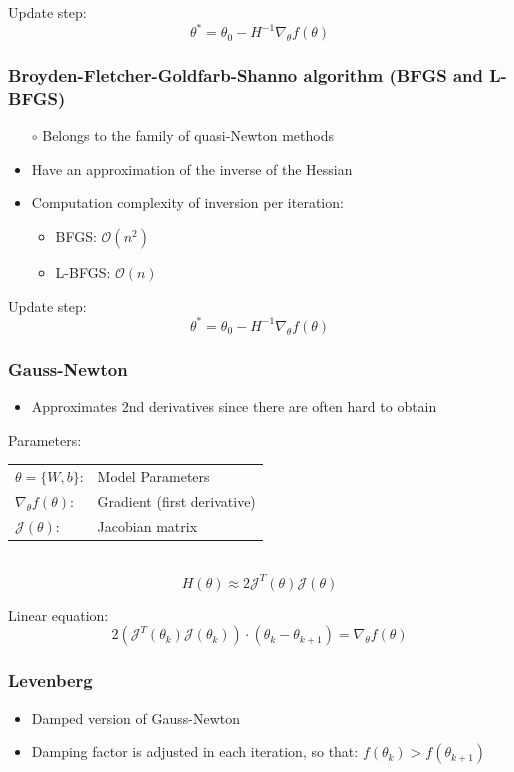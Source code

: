 \documentclass[10pt,a4paper]{article}
\newcommand{\props}{$\circ$}
\newcommand{\iprops}{\item[\props]}
\begin{document}
Update step:
$$
	\theta^* = \theta_0 - H^{-1} \nabla_\theta f(\theta)
$$

\subsubsection{Broyden-Fletcher-Goldfarb-Shanno algorithm (BFGS and L-BFGS)}
\begin{itemize}
	\item[\props] Belongs to the family of quasi-Newton methods
	\iprops Have an approximation of the inverse of the Hessian
	\iprops Computation complexity of inversion per iteration:
	\begin{itemize}
		\item BFGS: $\mathcal O(n^2)$
		\item L-BFGS: $\mathcal O(n)$
	\end{itemize}
\end{itemize}

Update step:
$$
	\theta^* = \theta_0 - H^{-1} \nabla_\theta f(\theta)
$$

\subsubsection{Gauss-Newton}
\begin{itemize}
	\item Approximates 2nd derivatives since there are often hard to obtain
\end{itemize}

Parameters: \\
\begin{tabular}{ll}
	$\theta = \{W, b\}$: & Model Parameters \\
	$\nabla_\theta f(\theta)$: & Gradient (first derivative) \\
	$\mathcal J(\theta)$: & Jacobian matrix
\end{tabular} \\

$$
	H(\theta) \approx 2 \mathcal J^T(\theta) \mathcal J(\theta)
$$

Linear equation:
$$
	2(\mathcal J^T(\theta_k) \mathcal J(\theta_k)) ⋅ (\theta_k - \theta_{k + 1}) = \nabla_\theta f(\theta)
$$
	

\subsubsection{Levenberg}
\begin{itemize}
	\item Damped version of Gauss-Newton
	\item Damping factor is adjusted in each iteration, so that: $f(\theta_k) > f(\theta_{k + 1})$
\end{itemize}
\end{document}
